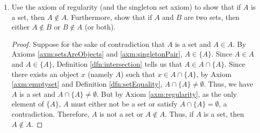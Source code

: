 \documentclass[../main.tex]{subfiles}
\begin{document}
\begin{enumerate}[ref={\thesection.\arabic*}]
\begin{proof}
        Axiom \ref{axm:replacement}: Let $A$ be a set. Let $P(y)$ be the statement "$P(x,y)$ is true for some $x\in A$," where $P(x,y)$ is a statement pertaining to $x$ and $y$ such that for each $x\in A$, there is at most one $y$ for which $P(x,y)$ is true. By Axiom \ref{axm:universalSpecification}, there exists a set $\{y:P(y)\text{ is true}\}=\{y:P(x,y)\text{ is true for some }x\in A\}$. By Axiom \ref{axm:universalSpecification}, $z\in\{y:P(x,y)\text{ is true for some }x\in A\}$ iff $P(z)$ is true, i.e., iff $P(x,z)$ is true for some $x\in A$.\par
        Axiom \ref{axm:specification}: Implied by the axiom of replacement (see Exercise \ref{exr:3.1.11}).
    \end{proof}
    \item \label{exr:3.2.2}Use the axiom of regularity (and the singleton set axiom) to show that if $A$ is a set, then $A\notin A$. Furthermore, show that if $A$ and $B$ are two sets, then either $A\notin B$ or $B\notin A$ (or both).
    \begin{proof}
        Suppose for the sake of contradiction that $A$ is a set and $A\in A$. By Axioms \ref{axm:setsAreObjects} and \ref{axm:singletonPair}, $A\in\{A\}$. Since $A\in A$ and $A\in\{A\}$, Definition \ref{dfn:intersection} tells us that $A\in A\cap\{A\}$. Since there exists an object $x$ (namely $A$) such that $x\in A\cap\{A\}$, by Axiom \ref{axm:emptyset} and Definition \ref{dfn:setEquality}, $A\cap\{A\}\neq\emptyset$. Thus, we have $A$ is a set and $A\cap\{A\}\neq\emptyset$. But by Axiom \ref{axm:regularity}, as the only element of $\{A\}$, $A$ must either not be a set or satisfy $A\cap\{A\}=\emptyset$, a contradiction. Therefore, $A$ is not a set or $A\notin A$. Thus, if $A$ is a set, then $A\notin A$.\par

\end{proof}
\end{enumerate}
\end{document}
